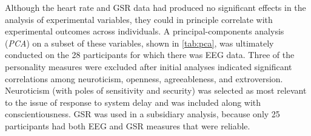 \documentclass[10pt,letterpaper]{article}
\begin{document}
Although the heart rate and GSR data had produced no significant effects in the analysis of experimental variables, they could in principle correlate with experimental outcomes across individuals. 
A principal-components analysis (\emph{PCA}) on a subset of these variables, shown in \cref{tab:pca}, was ultimately conducted on the 28 participants for which there was EEG data. 
Three of the personality measures were excluded after initial analyses indicated significant correlations among neuroticism, openness, agreeableness, and extroversion.
Neuroticism (with poles of sensitivity and security) was selected as most relevant to the issue of response to system delay and was included along with conscientiousness.
GSR was used in a subsidiary analysis, because only 25 participants had both EEG and GSR measures that were reliable.
\end{document}
